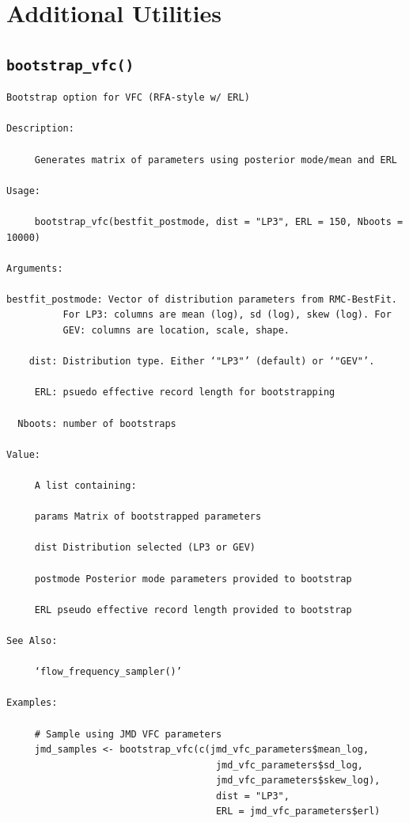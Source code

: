 \documentclass[
  letterpaper,
  DIV=11,
  numbers=noendperiod]{scrreprt}
\begin{document}
\section{Additional Utilities}\label{additional-utilities}

\subsection{\texorpdfstring{\texttt{bootstrap\_vfc()}}{bootstrap\_vfc()}}\label{bootstrap_vfc}

\begin{verbatim}
Bootstrap option for VFC (RFA-style w/ ERL)

Description:

     Generates matrix of parameters using posterior mode/mean and ERL

Usage:

     bootstrap_vfc(bestfit_postmode, dist = "LP3", ERL = 150, Nboots = 10000)
     
Arguments:

bestfit_postmode: Vector of distribution parameters from RMC-BestFit.
          For LP3: columns are mean (log), sd (log), skew (log). For
          GEV: columns are location, scale, shape.

    dist: Distribution type. Either ‘"LP3"’ (default) or ‘"GEV"’.

     ERL: psuedo effective record length for bootstrapping

  Nboots: number of bootstraps

Value:

     A list containing:

     params Matrix of bootstrapped parameters

     dist Distribution selected (LP3 or GEV)

     postmode Posterior mode parameters provided to bootstrap

     ERL pseudo effective record length provided to bootstrap

See Also:

     ‘flow_frequency_sampler()’

Examples:

     # Sample using JMD VFC parameters
     jmd_samples <- bootstrap_vfc(c(jmd_vfc_parameters$mean_log,
                                     jmd_vfc_parameters$sd_log,
                                     jmd_vfc_parameters$skew_log),
                                     dist = "LP3",
                                     ERL = jmd_vfc_parameters$erl)
     

\end{verbatim}
\end{document}

